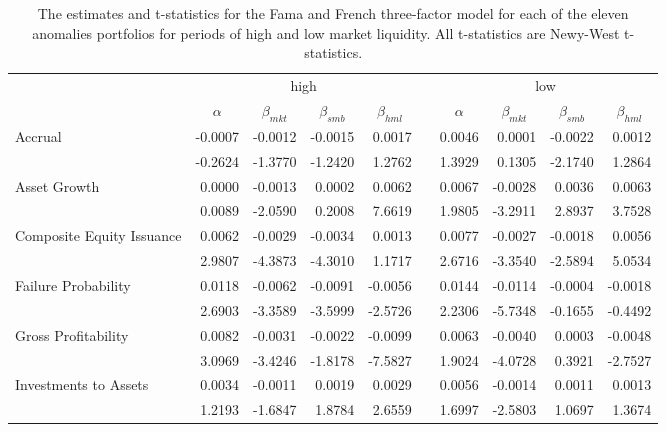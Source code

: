 \begin{table}[h]
    \caption{\newline The estimates and t-statistics for the Fama and French three-factor model for each of the eleven anomalies portfolios for periods of high and low market liquidity.  All t-statistics are Newy-West t-statistics.}
      \begin{tabular}{lrrrrlrrrr}
      \toprule
            & \multicolumn{4}{c}{high}      &       & \multicolumn{4}{c}{low} \\
  \cmidrule{2-5}\cmidrule{7-10}          & \multicolumn{1}{c}{$\alpha$} & \multicolumn{1}{c}{$\beta_{mkt}$} & \multicolumn{1}{c}{$\beta_{smb}$} & \multicolumn{1}{c}{$\beta_{hml}$} &       & \multicolumn{1}{c}{$\alpha$} & \multicolumn{1}{c}{$\beta_{mkt}$} & \multicolumn{1}{c}{$\beta_{smb}$} & \multicolumn{1}{c}{$\beta_{hml}$} \\
      \midrule
      Accrual & -0.0007 & -0.0012 & -0.0015 & 0.0017 &       & 0.0046 & 0.0001 & -0.0022 & 0.0012 \\
            & -0.2624 & -1.3770 & -1.2420 & 1.2762 &       & 1.3929 & 0.1305 & -2.1740 & 1.2864 \\
      Asset Growth & 0.0000 & -0.0013 & 0.0002 & 0.0062 &       & 0.0067 & -0.0028 & 0.0036 & 0.0063 \\
            & 0.0089 & -2.0590 & 0.2008 & 7.6619 &       & 1.9805 & -3.2911 & 2.8937 & 3.7528 \\
      Composite Equity Issuance & 0.0062 & -0.0029 & -0.0034 & 0.0013 &       & 0.0077 & -0.0027 & -0.0018 & 0.0056 \\
            & 2.9807 & -4.3873 & -4.3010 & 1.1717 &       & 2.6716 & -3.3540 & -2.5894 & 5.0534 \\
      Failure Probability & 0.0118 & -0.0062 & -0.0091 & -0.0056 &       & 0.0144 & -0.0114 & -0.0004 & -0.0018 \\
            & 2.6903 & -3.3589 & -3.5999 & -2.5726 &       & 2.2306 & -5.7348 & -0.1655 & -0.4492 \\
      Gross Profitability & 0.0082 & -0.0031 & -0.0022 & -0.0099 &       & 0.0063 & -0.0040 & 0.0003 & -0.0048 \\
            & 3.0969 & -3.4246 & -1.8178 & -7.5827 &       & 1.9024 & -4.0728 & 0.3921 & -2.7527 \\
      Investments to Assets & 0.0034 & -0.0011 & 0.0019 & 0.0029 &       & 0.0056 & -0.0014 & 0.0011 & 0.0013 \\
            & 1.2193 & -1.6847 & 1.8784 & 2.6559 &       & 1.6997 & -2.5803 & 1.0697 & 1.3674 \\

\end{tabular}
\end{table}
